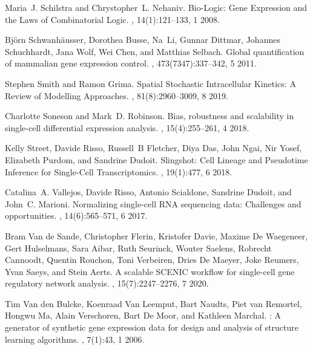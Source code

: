 \documentclass[10pt, a4paper]{article}
\begin{document}
\begin{thebibliography}{10}
	Maria~J. Schilstra and Chrystopher~L. Nehaniv.
	\newblock Bio-{{Logic}}: {{Gene Expression}} and the {{Laws}} of
	{{Combinatorial Logic}}.
	, 14(1):121--133, 1 2008.
	
	Bj{\"o}rn Schwanh{\"a}usser, Dorothea Busse, Na~Li, Gunnar Dittmar, Johannes
	Schuchhardt, Jana Wolf, Wei Chen, and Matthias Selbach.
	\newblock Global quantification of mammalian gene expression control.
	, 473(7347):337--342, 5 2011.
	
	Stephen Smith and Ramon Grima.
	\newblock Spatial {{Stochastic Intracellular Kinetics}}: {{A Review}} of
	{{Modelling Approaches}}.
	, 81(8):2960--3009, 8 2019.
	
	Charlotte Soneson and Mark~D. Robinson.
	\newblock Bias, robustness and scalability in single-cell differential
	expression analysis.
	, 15(4):255--261, 4 2018.
	
	Kelly Street, Davide Risso, Russell~B Fletcher, Diya Das, John Ngai, Nir Yosef,
	Elizabeth Purdom, and Sandrine Dudoit.
	\newblock Slingshot: {{Cell Lineage}} and {{Pseudotime Inference}} for
	{{Single}}-{{Cell Transcriptomics}}.
	, 19(1):477, 6 2018.
	
	Catalina~A. Vallejos, Davide Risso, Antonio Scialdone, Sandrine Dudoit, and
	John~C. Marioni.
	\newblock Normalizing single-cell {{RNA}} sequencing data: Challenges and
	opportunities.
	, 14(6):565--571, 6 2017.
	
	Bram {Van de Sande}, Christopher Flerin, Kristofer Davie, Maxime {De
		Waegeneer}, Gert Hulselmans, Sara Aibar, Ruth Seurinck, Wouter Saelens,
	Robrecht Cannoodt, Quentin Rouchon, Toni Verbeiren, Dries {De Maeyer}, Joke
	Reumers, Yvan Saeys, and Stein Aerts.
	\newblock A scalable {{SCENIC}} workflow for single-cell gene regulatory
	network analysis.
	, 15(7):2247--2276, 7 2020.
	
	Tim {Van den Bulcke}, Koenraad {Van Leemput}, Bart Naudts, Piet {van Remortel},
	Hongwu Ma, Alain Verschoren, Bart {De Moor}, and Kathleen Marchal.
	: A generator of synthetic gene expression data for design
	and analysis of structure learning algorithms.
	, 7(1):43, 1 2006.
	

\end{thebibliography}
\end{document}
